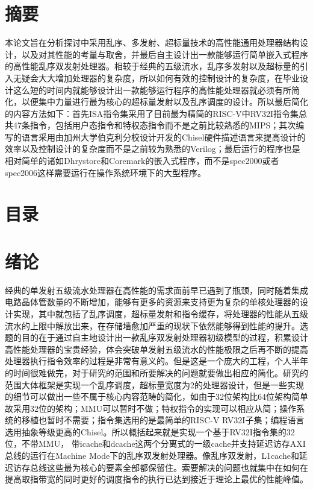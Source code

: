 \documentclass[11pt]{article}
\begin{document}

\section{摘要}
本论文旨在分析探讨中采用乱序、多发射、超标量技术的高性能通用处理器结构设计，以及对其性能的考量与取舍，并最后自主设计出一款能够运行简单嵌入式程序的高性能乱序双发射处理器。相较于经典的五级流水，乱序多发射以及超标量的引入无疑会大大增加处理器的复杂度，所以如何有效的控制设计的复杂度，在毕业设计这么短的时间内就能够设计出一款能够运行程序的高性能处理器就必须有所简化，以便集中力量进行最为核心的超标量发射以及乱序调度的设计。所以最后简化的内容方法如下：首先ISA指令集采用了目前最为精简的RISC-V中RV32I指令集总共47条指令，包括用户态指令和特权态指令而不是之前比较熟悉的MIPS；其次编写的语言采用由加州大学伯克利分校设计开发的Chisel硬件描述语言来提高设计的效率以及控制设计的复杂度而不是之前较为熟悉的Verilog；最后运行的程序也是相对简单的诸如Dhrystore和Coremark的嵌入式程序，而不是spec2000或者spec2006这样需要运行在操作系统环境下的大型程序。

\section{目录}

\section{绪论}
经典的单发射五级流水处理器在高性能的需求面前早已遇到了瓶颈，同时随着集成电路晶体管数量的不断增加，能够有更多的资源来支持更为复杂的单核处理器的设计实现，其中就包括了乱序调度，超标量发射和指令缓存，将处理器的性能从五级流水的上限中解放出来，在存储墙愈加严重的现状下依然能够得到性能的提升。选题的目的在于通过自主地设计出一款乱序双发射处理器初级模型的过程，积累设计高性能处理器的宝贵经验，体会突破单发射五级流水的性能极限之后再不断的提高处理器执行指令效率的过程是非常有意义的。但是这是一个庞大的工程，个人半年的时间很难做完，对于研究的范围和所要解决的问题就要做出相应的简化。研究的范围大体框架是实现一个乱序调度，超标量宽度为2的处理器设计，但是一些实现的细节可以做出一些不属于核心内容范畴的简化，如由于32位架构比64位架构简单故采用32位的架构；MMU可以暂时不做；特权指令的实现可以相应从简；操作系统的移植也暂时不需要；指令集选用的是最简单的RISC-V RV32I子集；编程语言选用抽象等级更高的Chisel。所以概括起来就是实现一个基于RV32I指令集的32位，不带MMU，
带icache和dcache这两个分离式的一级cache并支持延迟访存AXI总线的运行在Machine Mode下的乱序双发射处理器。像乱序双发射，L1cache和延迟访存总线这些最为核心的要素全部都保留住。索要解决的问题也就集中在如何在提高取指带宽的同时更好的调度指令的执行已达到接近于理论上最优的性能峰值。
\end{document}
